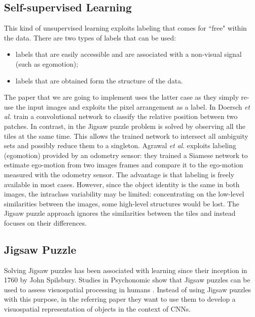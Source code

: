 \subsection{Self-supervised Learning}
This kind of unsupervised learning exploits labeling that comes for \textquotedblleft free" within the data. There are two types of labels that can be used:
\begin{itemize}
    \item labels that are easily accessible and are associated with a non-visual signal (such as egomotion);
    \item labels that are obtained form the structure of the data.
\end{itemize}
The paper that we are going to implement uses the latter case as they simply re-use the input images and exploits the pixel arrangement as a label.\newline
In \cite{context_prediction} Doersch \textit{et al.} train a convolutional network to classify the relative position between two patches. In contrast, in \cite{Noroozi_2016} the Jigsaw puzzle problem is solved by observing all the tiles at the same time. This allows the trained network to intersect all ambiguity sets and possibly reduce them to a singleton.
Agrawal \textit{et al.} \cite{learning_by_moving} exploits labeling (egomotion) provided by an odometry sensor: they trained a Siamese network to estimate ego-motion from two images frames and compare it to the ego-motion measured with the odometry sensor. The advantage is that labeling is freely available in most cases. However, since the object identity is the same in both images, the intraclass variability may be limited: concentrating on the low-level similarities between the images, some high-level structures would be lost. The Jigsaw puzzle approach ignores the similarities between the tiles and instead focuses on their differences.

\subsection{Jigsaw Puzzle}
Solving Jigsaw puzzles has been associated with learning since their inception in 1760 by John Spilsbury. Studies in Psychonomic show that Jigsaw puzzles can be used to assess visuospatial processing in humans \cite{assessing_visuospatial_processes}. Instead of using Jigsaw puzzles with this purpose, in the referring paper they want to use them to develop a visuospatial representation of objects in the context of CNNs.
